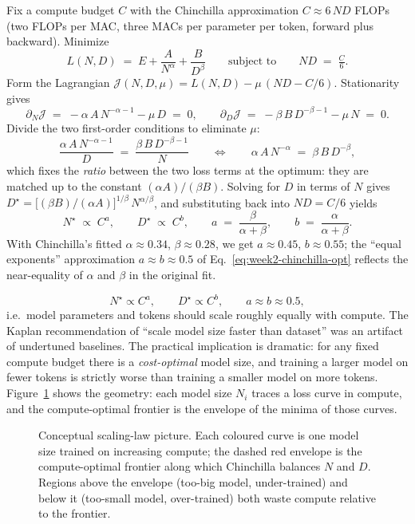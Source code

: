 \begin{derivation}
Fix a compute budget $C$ with the Chinchilla approximation
$C \approx 6\,N D$ FLOPs (two FLOPs per MAC, three MACs per parameter
per token, forward plus backward). Minimize
\[
L(N, D) \;=\; E + \frac{A}{N^{\alpha}} + \frac{B}{D^{\beta}}
\qquad\text{subject to}\qquad
N D \;=\; \tfrac{C}{6}.
\]
Form the Lagrangian
$\mathcal{J}(N, D, \mu) = L(N, D) - \mu\,(N D - C/6)$. Stationarity
gives
\[
\partial_N \mathcal{J} \;=\; -\alpha\,A\,N^{-\alpha-1} - \mu\,D
\;=\; 0,
\qquad
\partial_D \mathcal{J} \;=\; -\beta\,B\,D^{-\beta-1} - \mu\,N
\;=\; 0.
\]
Divide the two first-order conditions to eliminate $\mu$:
\[
\frac{\alpha\,A\,N^{-\alpha-1}}{D} \;=\; \frac{\beta\,B\,D^{-\beta-1}}{N}
\qquad\Longleftrightarrow\qquad
\alpha\,A\,N^{-\alpha} \;=\; \beta\,B\,D^{-\beta},
\]
which fixes the \emph{ratio} between the two loss terms at the
optimum: they are matched up to the constant
$(\alpha A)/(\beta B)$. Solving for $D$ in terms of $N$ gives
$D^\star = \big[(\beta B)/(\alpha A)\big]^{1/\beta}\,N^{\alpha/\beta}$,
and substituting back into $N D = C/6$ yields
\[
N^\star \;\propto\; C^{a},
\qquad
D^\star \;\propto\; C^{b},
\qquad
a \;=\; \frac{\beta}{\alpha + \beta},
\qquad
b \;=\; \frac{\alpha}{\alpha + \beta}.
\]
With Chinchilla's fitted $\alpha \approx 0.34$, $\beta \approx 0.28$,
we get $a \approx 0.45$, $b \approx 0.55$; the ``equal exponents''
approximation $a \approx b \approx 0.5$ of
Eq.~\eqref{eq:week2-chinchilla-opt} reflects the near-equality of
$\alpha$ and $\beta$ in the original fit.
\end{derivation}

\begin{equation}
\label{eq:week2-chinchilla-opt}
N^\star \propto C^{a},
\qquad
D^\star \propto C^{b},
\qquad a \approx b \approx 0.5,
\end{equation}
i.e.\ model parameters and tokens should scale roughly equally with
compute. The Kaplan recommendation of ``scale model size faster than
dataset'' was an artifact of undertuned baselines. The practical
implication is dramatic: for any fixed compute budget there is a
\emph{cost-optimal} model size, and training a larger model on fewer
tokens is strictly worse than training a smaller model on more tokens.
Figure~\ref{fig:scaling_laws} shows the geometry: each model size
$N_i$ traces a loss curve in compute, and the compute-optimal
frontier is the envelope of the minima of those curves.

\begin{figure}[H]
  \centering
  
  \caption{Conceptual scaling-law picture. Each coloured curve is
           one model size trained on increasing compute; the
           dashed red envelope is the compute-optimal frontier
           along which Chinchilla balances $N$ and $D$. Regions
           above the envelope (too-big model, under-trained) and
           below it (too-small model, over-trained) both waste
           compute relative to the frontier.}
  \label{fig:scaling_laws}
\end{figure}

